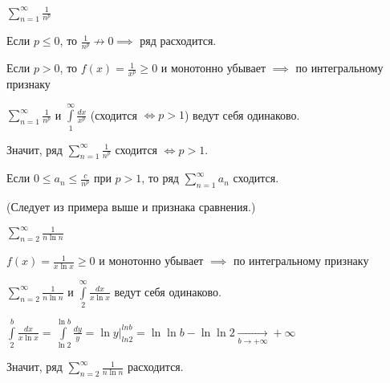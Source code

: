 \begin{example} \thmslashn

    $\sum\limits_{n=1}^{\infty} \frac{1}{n^p}$
    
    Если $p \le 0$, то $\frac{1}{n^p} \nrightarrow 0 \implies$ ряд расходится.
    
    Если $p > 0$, то $f(x) = \frac{1}{x^p} \ge 0$ и монотонно убывает $\implies$ по интегральному признаку
    
    $\sum\limits_{n=1}^{\infty} \frac{1}{n^p}$ и $\int\limits_{1}^{\infty} \frac{dx}{x^p}$ (сходится $\iff p > 1$) ведут себя одинаково.
    
    Значит, ряд $\sum\limits_{n=1}^{\infty} \frac{1}{n^p}$ сходится $\iff p > 1$.
    
    \begin{consequence} \thmslashn
    	
    	Если $0 \le a_n \le \frac{c}{n^p}$ при $p > 1$, то ряд $\sum\limits_{n=1}^{\infty} a_n$ сходится.

    	(Следует из примера выше и признака сравнения.)

    \end{consequence}
    
\end{example}

\begin{example} \thmslashn

    $\sum\limits_{n=2}^{\infty} \frac{1}{n\ln{n}}$
    
    $f(x) = \frac{1}{x\ln{x}} \ge 0$ и монотонно убывает $\implies$ по интегральному признаку
    
    $\sum\limits_{n=2}^{\infty} \frac{1}{n\ln{n}}$ и $\int\limits_{2}^{\infty} \frac{dx}{x\ln{x}}$ ведут себя одинаково.
    
    $\int\limits_{2}^{b} \frac{dx}{x\ln{x}} = \int\limits_{\ln{2}}^{\ln{b}} \frac{dy}{y} = \ln{y} \Bigr|_{ln{2}}^{ln{b}} = \ln{\ln{b}} - \ln{\ln{2}} \xrightarrow[b \to +\infty]{} +\infty$
    
    Значит, ряд $\sum\limits_{n=2}^{\infty} \frac{1}{n\ln{n}}$ расходится.

\end{example}
